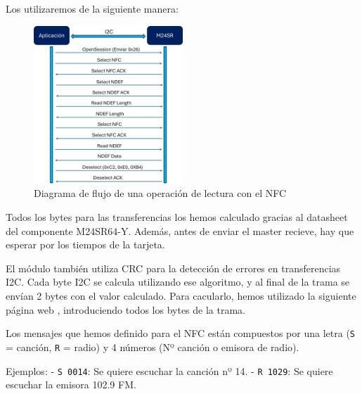 Los utilizaremos de la siguiente manera:

\begin{figure}[h]
    \centering
    \includegraphics[width=0.5\textwidth]{images/3/3-2/SD/Diagrama.png}
    \caption{Diagrama de flujo de una operación de lectura con el NFC}
    \label{fig:label}
\end{figure}

Todos los bytes para las transferencias los hemos calculado gracias al datasheet del componente M24SR64-Y. Además, antes de enviar el master recieve, hay que esperar por los tiempos de la tarjeta.

El módulo también utiliza CRC para la detección de errores en transferencias I2C. Cada byte I2C se calcula utilizando ese algoritmo, y al final de la trama se envían 2 bytes con el valor calculado. Para cacularlo, hemos utilizado la siguiente página web \cite{CalculoCRC}, introduciendo todos los bytes de la trama.

Los mensajes que hemos definido para el NFC están compuestos por una letra (\texttt{S} = canción, \texttt{R} = radio) y 4 números (Nº canción o emisora de radio).

Ejemplos: 
	- \texttt{S 0014}: Se quiere escuchar la canción nº 14.
	- \texttt{R 1029}: Se quiere escuchar la emisora 102.9 FM.